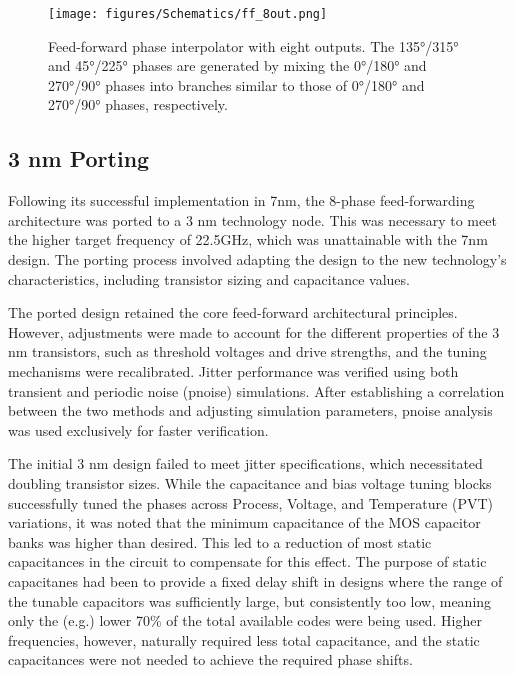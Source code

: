 \begin{figure}[h]
  \centering
  \texttt{[image: figures/Schematics/ff\_8out.png]}
  \caption{Feed-forward phase interpolator with eight outputs. The \ang{135}/\ang{315} and \ang{45}/\ang{225} phases are generated by mixing the \ang{0}/\ang{180} and \ang{270}/\ang{90} phases into branches similar to those of \ang{0}/\ang{180} and \ang{270}/\ang{90} phases, respectively.}
  \label{fig:FF_8out}
\end{figure}

\subsection{3 nm Porting}\label{sec:3nm_porting}

Following its successful implementation in 7nm, the 8-phase feed-forwarding architecture was ported to a 3 nm technology node. This was necessary to meet the higher target frequency of 22.5GHz, which was unattainable with the 7nm design. The porting process involved adapting the design to the new technology's characteristics, including transistor sizing and capacitance values.

The ported design retained the core feed-forward architectural principles. However, adjustments were made to account for the different properties of the 3 nm transistors, such as threshold voltages and drive strengths, and the tuning mechanisms were recalibrated. Jitter performance was verified using both transient and periodic noise (pnoise) simulations. After establishing a correlation between the two methods and adjusting simulation parameters, pnoise analysis was used exclusively for faster verification.

The initial 3 nm design failed to meet jitter specifications, which necessitated doubling transistor sizes. While the capacitance and bias voltage tuning blocks successfully tuned the phases across Process, Voltage, and Temperature (PVT) variations, it was noted that the minimum capacitance of the MOS capacitor banks was higher than desired. This led to a reduction of most static capacitances in the circuit to compensate for this effect. The purpose of static capacitanes had been to provide a fixed delay shift in designs where the range of the tunable capacitors was sufficiently large, but consistently too low, meaning only the (e.g.) lower 70\% of the total available codes were being used. Higher frequencies, however, naturally required less total capacitance, and the static capacitances were not needed to achieve the required phase shifts. 

